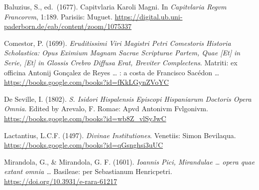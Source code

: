 \documentclass[
]{article}
\begin{document}
Baluzius, S., ed.~(1677). Capitvlaria Karoli Magni. In \emph{Capitvlaria
Regvm Francorvm}, 1:189. Parisiis: Muguet.
\url{https://digital.ub.uni-paderborn.de/eab/content/zoom/1075337}

Comestor, P. (1699). \emph{Eruditissimi Viri Magistri Petri Comestoris
Historia Scholastica: Opus Eximium Magnam Sacrae Scripturae Partem, Quae
{[}Et{]} in Serie, {[}Et{]} in Glossis Crebro Diffusa Erat, Breviter
Complectens}. Matriti: ex officina Antonij Gonçalez de Reyes \ldots{} :
a costa de Francisco Sacédon \ldots{}
\url{https://books.google.com/books?id=fKkLGynZVoYC}

De Seville, I. (1802). \emph{S. Isidori Hispalensis Episcopi Hispaniarum
Doctoris Opera Omnia}. Edited by Arevalo, F. Romae: Apvd Antonivm
Fvlgonivm. \url{https://books.google.com/books?id=wb8Z_vlSyJwC}

Lactantius, L.C.F. (1497). \emph{Divinae Institutiones}. Venetiis: Simon
Bevilaqua. \url{https://books.google.com/books?id=qGsnghsi3uUC}

Mirandola, G., \& Mirandola, G. F. (1601). \emph{Ioannis Pici,
Mirandulae \ldots{} opera quae extant omnia \ldots{}} Basileae: per
Sebastianum Henricpetri. \url{https://doi.org/10.3931/e-rara-61217}
\end{document}
